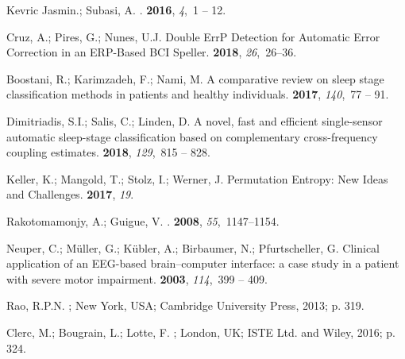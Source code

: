 \documentclass[brainsci,article,accept,moreauthors,pdftex,10pt,a4paper]{mdpi}
\begin{document}
\begin{thebibliography}{-------}
{Kevric Jasmin}.; Subasi, A.
.
 {\bf 2016}, {\em
  4},~1 -- 12.
  
Cruz, A.; Pires, G.; Nunes, U.J.
\newblock Double ErrP Detection for Automatic Error Correction in an ERP-Based
  BCI Speller.
 {\bf 2018}, {\em 26},~26--36.
  
Boostani, R.; Karimzadeh, F.; Nami, M.
\newblock A comparative review on sleep stage classification methods in
  patients and healthy individuals.
 {\bf 2017}, {\em
  140},~77 -- 91.
  
Dimitriadis, S.I.; Salis, C.; Linden, D.
\newblock A novel, fast and efficient single-sensor automatic sleep-stage
  classification based on complementary cross-frequency coupling estimates.
 {\bf 2018}, {\em 129},~815 -- 828.

Keller, K.; Mangold, T.; Stolz, I.; Werner, J.
\newblock Permutation Entropy: New Ideas and Challenges.
 {\bf 2017}, {\em 19}.

Rakotomamonjy, A.; Guigue, V.
.
 {\bf 2008}, {\em
  55},~1147--1154.
  
Neuper, C.; Müller, G.; Kübler, A.; Birbaumer, N.; Pfurtscheller, G.
\newblock Clinical application of an EEG-based brain–computer interface: a
  case study in a patient with severe motor impairment.
 {\bf 2003}, {\em 114},~399 -- 409.
  
Rao, R.P.N.
; New York, USA; Cambridge
  University Press,  2013; p. 319.
  
Clerc, M.; Bougrain, L.; Lotte, F.
; London, UK; ISTE Ltd. and Wiley,  2016; p. 324.

\end{thebibliography}


\end{document}
